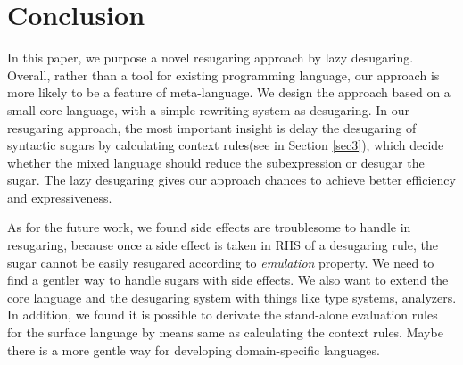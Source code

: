 \section{Conclusion}
\label{sec7}


In this paper, we purpose a novel resugaring approach by lazy desugaring.
Overall, rather than a tool for existing programming language, our approach is more likely to be a feature of meta-language. We design the approach based on a small core language, with a simple rewriting system as desugaring.
In our resugaring approach, the most important insight is delay the desugaring of syntactic sugars by calculating context rules(see in Section \ref{sec3}), which decide whether the mixed language should reduce the subexpression or desugar the sugar. The lazy desugaring gives our approach chances to achieve better efficiency and expressiveness.



As for the future work, we found side effects are troublesome to handle in resugaring, because once a side effect is taken in RHS of a desugaring rule, the sugar cannot be easily resugared according to \emph{emulation} property. We need to find a gentler way to handle sugars with side effects. We also want to extend the core language and the desugaring system with things like type systems, analyzers. In addition, we found it is possible to derivate the stand-alone evaluation rules for the surface language by means same as calculating the context rules. Maybe there is a more gentle way for developing domain-specific languages.
